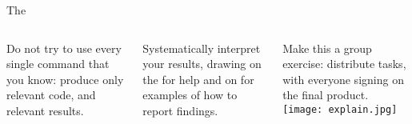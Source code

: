 \documentclass[t]{beamer}
\begin{document}
	
	
	\begin{frame}[t]{The }
		\begin{columns}[T]
			Do not try to use every single command that you know: produce only relevant code, and relevant results.\vspace{1em}%
			
			Systematically interpret your results, drawing on the  for help and on  for examples of how to report findings.\vspace{1em}%
			
			Make this a group exercise: distribute tasks, with everyone signing on the final product.%
			\texttt{[image: explain.jpg]}
		\end{columns}
	\end{frame}
	
\end{document}
